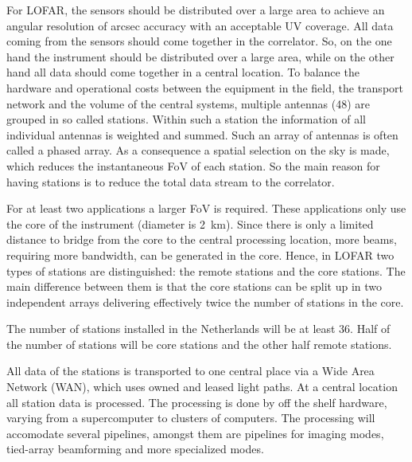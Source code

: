 \documentclass[journal]{IEEEtran}
\begin{document}
For LOFAR, the sensors should be distributed over a large area to achieve an angular resolution of arcsec accuracy with an acceptable UV coverage. All data coming from the sensors should come together in the correlator. So, on the one hand the instrument should be distributed over a large area, while on the other hand all data should come together in a central location. To balance the hardware and operational costs between the equipment in the field, the transport network and the volume of the central systems, multiple antennas (48) are grouped in so called stations. Within such a station the information of all individual antennas is weighted and summed. Such an array of antennas is often called a phased array. As a consequence a spatial selection on the sky is made, which reduces the instantaneous FoV of each station. So the main reason for having stations is to reduce the total data stream to the correlator.

For at least two applications a larger FoV is required. These applications only use the core of the instrument (diameter is 2~km). Since there is only a limited distance to bridge from the core to the central processing location, more beams, requiring more bandwidth, can be generated in the core. Hence, in LOFAR two types of stations are distinguished: the remote stations and the core stations. 
The main difference between them is that the core stations can be split up in two independent arrays delivering effectively twice the number of stations in the core.

The number of stations installed in the Netherlands will be at least 36. Half of the number of stations will be core stations and the other half remote stations. 

All data of the stations is transported to one central place via a Wide Area Network (WAN), which uses owned and leased light paths. At a central location all station data is processed. The processing is done by off the shelf hardware, varying from a supercomputer to clusters of computers. The processing will accomodate several pipelines, amongst them are pipelines for imaging modes, tied-array beamforming and more specialized modes.


 

\end{document}
